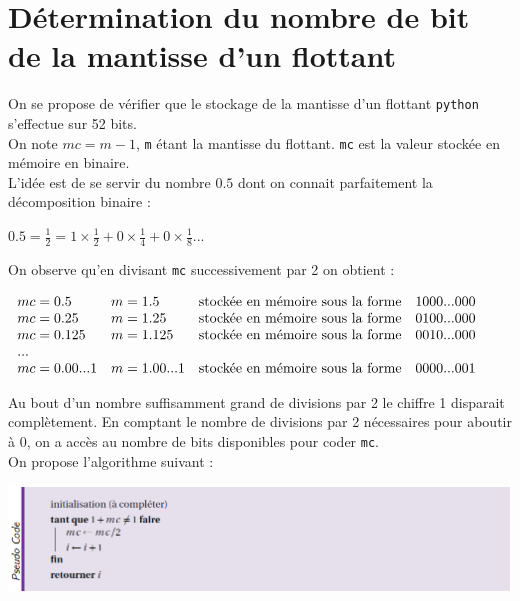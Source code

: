 \documentclass[t,11pt]{article}
\begin{document}
\section*{Détermination du nombre de bit de la mantisse d'un flottant}
On se propose de vérifier que le stockage de la mantisse d'un flottant \texttt{python} s'effectue sur 52 bits.\\

On note $mc=m-1$, \texttt{m} étant la mantisse du flottant.
\texttt{mc} est la valeur stockée en mémoire en binaire.\\

L'idée est de se servir du nombre $0.5$ dont on connait parfaitement la décomposition binaire :

\begin{center}
$0.5=\frac{1}{2}=1 \times \frac{1}{2} + 0 \times \frac{1}{4} + 0 \times \frac{1}{8}... $
\end{center}

On observe qu'en divisant \texttt{mc} successivement par 2 on obtient :
\begin{center}
$
\begin{array}{l l l l}
mc=0.5 & m=1.5 & \mbox{stockée en mémoire sous la forme} & 1000...000\\
mc=0.25 & m=1.25 & \mbox{stockée en mémoire sous la forme} & 0100...000\\
mc=0.125 & m=1.125 & \mbox{stockée en mémoire sous la forme} & 0010...000\\
...\\
mc=0.00...1 & m=1.00...1 & \mbox{stockée en mémoire sous la forme} & 0000...001\\
\end{array}
$
\end{center}

Au bout d'un nombre suffisamment grand de divisions par 2 le chiffre 1 disparait complètement. En comptant le nombre de divisions par 2 nécessaires pour aboutir à 0, on a accès au nombre de bits disponibles pour coder \texttt{mc}.\\
On propose l'algorithme suivant :

\includegraphics[scale=0.67]{pseudo.png}
\end{document}
